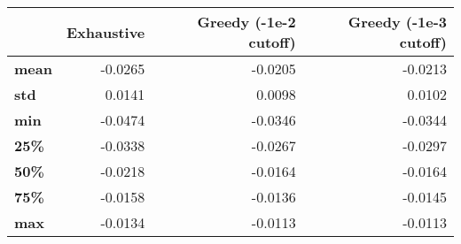 \begin{tabular}{lrrr}
\toprule
{} &  Exhaustive &  Greedy (-1e-2 cutoff) &  Greedy (-1e-3 cutoff) \\
\midrule
\textbf{mean} &     -0.0265 &                -0.0205 &                -0.0213 \\
\textbf{std } &      0.0141 &                 0.0098 &                 0.0102 \\
\textbf{min } &     -0.0474 &                -0.0346 &                -0.0344 \\
\textbf{25\% } &     -0.0338 &                -0.0267 &                -0.0297 \\
\textbf{50\% } &     -0.0218 &                -0.0164 &                -0.0164 \\
\textbf{75\% } &     -0.0158 &                -0.0136 &                -0.0145 \\
\textbf{max } &     -0.0134 &                -0.0113 &                -0.0113 \\
\bottomrule
\end{tabular}
